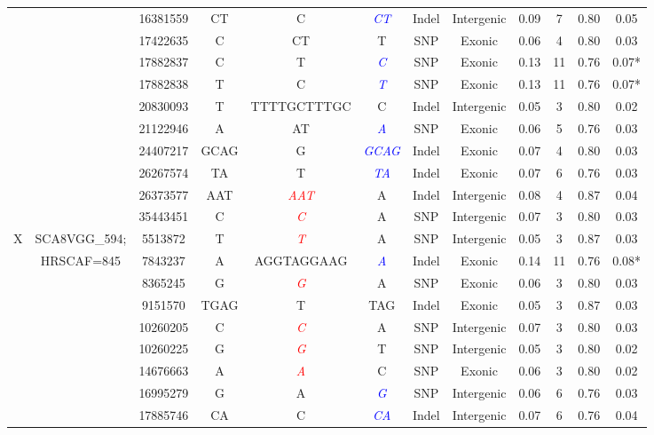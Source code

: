 \begin{table}[!b]
\begin{center}
\begin{tabular}{ccS[table-format=8.0]ccccccS[table-format=2.0]S[table-format=1.2]S[table-format=1.3]}
 &  & 16381559 & CT & C & \textcolor{blue}{\textit{CT}} & Indel & Intergenic & 0.09 & 7 & 0.80 & 0.05\\
 &  & 17422635 & C & CT & T & SNP & Exonic & 0.06 & 4 & 0.80 & 0.03\\
 &  & 17882837 & C & T & \textcolor{blue}{\textit{C}} & SNP & Exonic & 0.13 & 11 & 0.76 & 0.07*\\
 &  & 17882838 & T & C & \textcolor{blue}{\textit{T}} & SNP & Exonic & 0.13 & 11 & 0.76 & 0.07*\\
 &  & 20830093 & T & TTTTGCTTTGC & C & Indel & Intergenic & 0.05 & 3 & 0.80 & 0.02\\
 &  & 21122946 & A & AT & \textcolor{blue}{\textit{A}} & SNP & Exonic & 0.06 & 5 & 0.76 & 0.03\\
 &  & 24407217 & GCAG & G & \textcolor{blue}{\textit{GCAG}} & Indel & Exonic & 0.07 & 4 & 0.80 & 0.03\\
 &  & 26267574 & TA & T & \textcolor{blue}{\textit{TA}} & Indel & Exonic & 0.07 & 6 & 0.76 & 0.03\\
 &  & 26373577 & AAT & \textcolor{red}{\textit{AAT}} & A & Indel & Intergenic & 0.08 & 4 & 0.87 & 0.04\\
 &  & 35443451 & C & \textcolor{red}{\textit{C}} & A & SNP & Intergenic & 0.07 & 3 & 0.80 & 0.03\\
 \midrule
 X & SCA8VGG\_594; & 5513872 & T & \textcolor{red}{\textit{T}} & A & SNP & Intergenic & 0.05 & 3 & 0.87 & 0.03\\
 & HRSCAF=845 & 7843237 & A & AGGTAGGAAG & \textcolor{blue}{\textit{A}} & Indel & Exonic & 0.14 & 11 & 0.76 & 0.08*\\
 &  & 8365245 & G & \textcolor{red}{\textit{G}} & A & SNP & Exonic & 0.06 & 3 & 0.80 & 0.03\\
 &  & 9151570 & TGAG & T & TAG & Indel & Exonic & 0.05 & 3 & 0.87 & 0.03\\
 &  & 10260205 & C &\textcolor{red}{\textit{C}} & A & SNP & Intergenic & 0.07 & 3 & 0.80 & 0.03\\
 &  & 10260225 & G &\textcolor{red}{\textit{G}} & T & SNP & Intergenic & 0.05 & 3 & 0.80 & 0.02\\
 &  & 14676663 & A &\textcolor{red}{\textit{A}} & C & SNP & Exonic & 0.06 & 3 & 0.80 & 0.02\\
 &  & 16995279 & G & A & \textcolor{blue}{\textit{G}} & SNP & Intergenic & 0.06 & 6 & 0.76 & 0.03\\
 &  & 17885746 & CA & C & \textcolor{blue}{\textit{CA}} & Indel & Intergenic & 0.07 & 6 & 0.76 & 0.04\\

\end{tabular}
\end{center}
\end{table}
